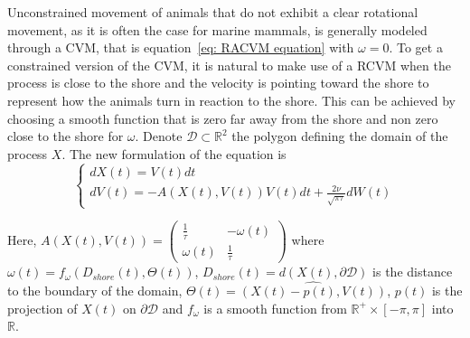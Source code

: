 \documentclass[11pt]{article}
\newcommand {\R}{\mathbb{R}}
\newcommand {\1}{\mathbb{1}}
\begin{document}
Unconstrained movement of animals that do not exhibit a clear rotational movement, as it is often the case for marine mammals, is generally modeled through a CVM, that is equation~\ref{eq: RACVM equation} with $\omega=0$.
To get a constrained version of the CVM, it is natural to make use of a RCVM when the process is close to the shore and the velocity is pointing toward the shore to represent how the animals turn in reaction to the shore.
This can be achieved by choosing a smooth function that is zero far away from the shore and non zero close to the shore for $\omega$.
Denote $\mathcal{D} \subset \R^2$ the polygon defining the domain of the process $X$. The new formulation of the equation is 
\begin{equation} \left\{
	\begin{array}{l}
		dX(t)=V(t) dt \\
		dV(t)=-A(X(t),V(t))V(t)dt+\frac{2\nu}{\sqrt{\pi \tau}} dW(t) 
		
	\end{array}
	\right.
	\label{eq: CRCVM equation}
\end{equation}

Here, $A(X(t),V(t))=\begin{pmatrix} 
	\frac{1}{\tau} & -\omega(t) \\
	\omega(t) & \frac{1}{\tau}
\end{pmatrix}$
where $\omega(t)=f_{\omega}(D_{shore}(t),\Theta(t))$, $D_{shore}(t)=d(X(t),\partial\mathcal{D})$ is the distance to the boundary of the domain,
$\Theta(t)=\widehat{(X(t)-p(t),V(t))}$, $p(t)$ is the projection of $X(t)$ on $\partial \mathcal{D}$ and $f_{\omega}$ is a smooth function from $\R^{+} \times [-\pi,\pi]$ into $\R$.
\end{document}
